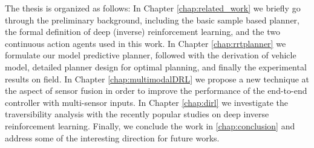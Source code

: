 \documentclass[../thesis.tex]{subfiles}
\begin{document}
The thesis is organized as follows:
In Chapter \ref{chap:related_work} we briefly go through the preliminary background, including the basic sample based planner, the formal definition of deep (inverse) reinforcement learning, and the two continuous action agents used in this work.
In Chapter \ref{chap:rrtplanner} we formulate our model predictive planner, followed with the derivation of vehicle model, detailed planner design for optimal planning, and finally the experimental results on field.
In Chapter \ref{chap:multimodalDRL} we propose a new technique at the aspect of sensor fusion in order to improve the performance of the end-to-end controller with multi-sensor inputs. 
In Chapter \ref{chap:dirl} we investigate the traversibility analysis with the recently popular studies on deep inverse reinforcement learning.
Finally, we conclude the work in \ref{chap:conclusion} and address some of the interesting direction for future works.
 
\end{document}
